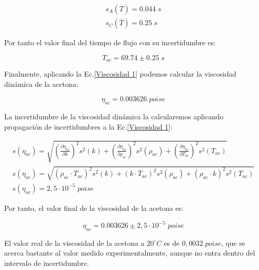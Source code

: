 \documentclass[a4paper,12pt,titlepage]{report}
\begin{document}
\begin{equation}
    \begin{gathered}
        s_A(\overline{T}) = 0.044 \; s \\
        s_C(\overline{T}) = 0.25 \; s
    \end{gathered}
\end{equation}

Por tanto el valor final del tiempo de flujo con su incertidumbre es:

\begin{equation}
    T_{ac} = 69.74 \pm 0.25 \; s
\end{equation}

Finalmente, aplicando la Ec.\ref{Viscosidad 1} podemos calcular la viscosidad dinámica de la acetona:

\begin{equation}
    \eta_{ac} = 0.003626 \; poise
\end{equation}

La incertidumbre de la viscosidad dinámica la calcularemos aplicando propagación de incertidumbres a la Ec.\ref{Viscosidad 1}:

\begin{equation}
    \begin{gathered}
    s\left(\eta_{ac}\right) =\sqrt{\left(\frac{\partial \eta_{ac}}{\partial k}\right)^2 s^2(k)+\left(\frac{\partial \eta_{a c}}{\partial \rho_{a c}}\right)^2 s^2\left(\rho_{ac}\right)+\left(\frac{\partial \eta_{ac}}{\partial T_{ac}}\right)^2 s^2\left(T_{a c}\right)} \\
    s\left(\eta_{a c}\right)  =\sqrt{\left(\rho_{a c} \cdot T_{a c}\right)^2 s^2(k)+\left(k \cdot T_{a c}\right)^2 s^2\left(\rho_{a c}\right)+\left(\rho_{a c} \cdot k\right)^2 s^2\left(T_{a c}\right)} \\
    s(\eta_{ac}) = 2,5 \cdot 10^{-5} \; poise
    \end{gathered}
    \label{Inc visc}
\end{equation}

Por tanto, el valor final de la viscosidad de la acetona es:

\begin{equation}
    \eta_{ac} = 0.003626 \pm 2,5 \cdot 10^{-5} \; poise
\end{equation}

El valor real de la viscosidad de la acetona a $20^{\circ} C$ es de $0,0032 \; poise$, que se acerca bastante al valor medido experimentalmente, aunque no entra dentro del intervalo de incertidumbre.
\end{document}
